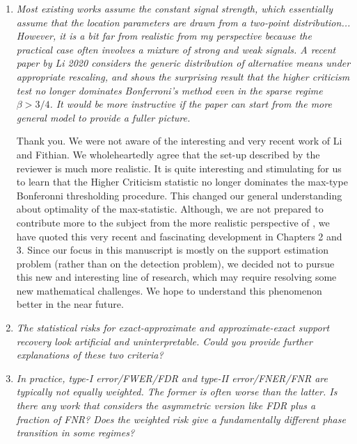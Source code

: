 \documentclass[11pt]{article}
\begin{document}
   \begin{enumerate}
    \item {\em Most existing works assume the constant signal strength, which essentially assume that the location parameters are drawn from a two-point distribution... However, it is a bit far from realistic from my perspective because the practical case often involves a mixture of strong and weak signals. A recent paper by Li 2020 considers the generic distribution of alternative means under appropriate rescaling, and shows the surprising result that the higher criticism test no longer dominates Bonferroni’s method even in the sparse regime $\beta >3/4$. It would be more instructive if the paper can start from the more general model to provide a fuller picture.}
    
    \medskip
    Thank you.  We were not aware of the interesting and very recent work \cite{li2020optimality}
     of Li and Fithian. We wholeheartedly agree that the set-up described by the reviewer is much more realistic.  
     It is quite interesting and stimulating for us to learn that the Higher Criticism statistic no longer dominates the max-type Bonferonni thresholding procedure.  
     This changed our general understanding about optimality of the max-statistic.  Although, we are not prepared to contribute more to the subject from 
     the more realistic perspective of  \cite{li2020optimality}, we have quoted this very recent and fascinating development in Chapters 2 and 3.  
     Since our focus in this manuscript is mostly on the support estimation problem (rather than on the detection problem), we decided not to pursue 
     this new and interesting line of research, which may require resolving some new mathematical challenges. We hope to understand this phenomenon 
     better in the near future.
     
     
    \item {\em The statistical risks for exact-approximate and approximate-exact support recovery look artificial and uninterpretable. 
    Could you provide further explanations of these two criteria?} 
    
        
        \item {\em In practice, type-I error/FWER/FDR and type-II error/FNER/FNR are typically not equally weighted. The former is often worse than the latter. Is there any work that considers the asymmetric version like FDR plus a fraction of FNR? Does the weighted risk give a fundamentally different phase transition in some regimes?}
        

\end{enumerate}
\end{document}
